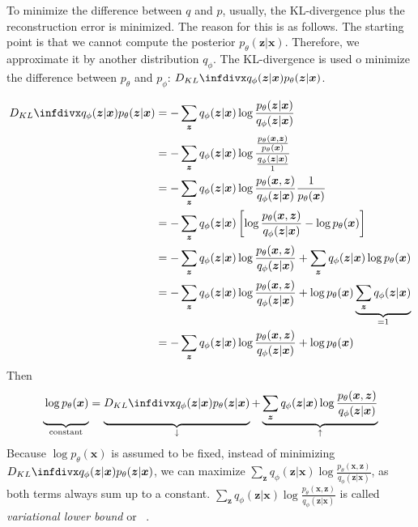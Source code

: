 To minimize the difference between $q$ and $p$, usually, the \ac{KL-divergence} plus the reconstruction error is minimized.
The reason for this is as follows.
The starting point is that we cannot compute the posterior $p_\theta(\bm{z}|\bm{x})$.
Therefore, we approximate it by another distribution $q_\phi$.
The \ac{KL-divergence} is used o minimize the difference between $p_{\theta}$ and $p_{\phi}$: $\kldiv{q_\phi(\bm{z}|\bm{x})}{p_\theta(\bm{z}|\bm{x})}$.

\begin{align}
    \kldiv{q_\phi(\bm{z}|\bm{x})}{p_\theta(\bm{z}|\bm{x})} &= -\sum_{\bm{z}} q_\phi(\bm{z}|\bm{x}) \log \frac{p_\theta(\bm{z}|\bm{x})}{q_\phi(\bm{z}|\bm{x})} \\
    &= -\sum_{\bm{z}} q_\phi(\bm{z}|\bm{x}) \log \frac{\frac{p_\theta(\bm{x},\bm{z})}{p_\theta(\bm{x})}}{\frac{q_\phi(\bm{z}|\bm{x})}{1}}\\
    &= -\sum_{\bm{z}} q_\phi(\bm{z}|\bm{x}) \log \frac{p_\theta(\bm{x},\bm{z})}{q_\phi(\bm{z}|\bm{x})}\frac{1}{p_\theta(\bm{x})}\\
    &= -\sum_{\bm{z}} q_\phi(\bm{z}|\bm{x}) \left[ \log \frac{p_\theta(\bm{x},\bm{z})}{q_\phi(\bm{z}|\bm{x})} - \log p_\theta(\bm{x}) \right]\\
    &= -\sum_{\bm{z}} q_\phi(\bm{z}|\bm{x}) \log \frac{p_\theta(\bm{x},\bm{z})}{q_\phi(\bm{z}|\bm{x})} + \sum_{\bm{z}} q_\phi(\bm{z}|\bm{x}) \log p_\theta(\bm{x}) \\
    &= -\sum_{\bm{z}} q_\phi(\bm{z}|\bm{x}) \log \frac{p_\theta(\bm{x},\bm{z})}{q_\phi(\bm{z}|\bm{x})} + \log p_\theta(\bm{x}) \underbrace{\sum_{\bm{z}} q_\phi(\bm{z}|\bm{x})}_{=1} \\
    &= -\sum_{\bm{z}} q_\phi(\bm{z}|\bm{x}) \log \frac{p_\theta(\bm{x},\bm{z})}{q_\phi(\bm{z}|\bm{x})} + \log p_\theta(\bm{x})
\end{align}
Then
\begin{align}
    \underbrace{\vphantom{\sum_{\bm{z}} x}\log p_\theta(\bm{x})}_{\text{constant}} =  \underbrace{\vphantom{\sum_{\bm{z}} x}\kldiv{q_\phi(\bm{z}|\bm{x})}{p_\theta(\bm{z}|\bm{x})}}_{\downarrow}  + \underbrace{\sum_{\bm{z}} q_\phi(\bm{z}|\bm{x}) \log \frac{p_\theta(\bm{x},\bm{z})}{q_\phi(\bm{z}|\bm{x})}}_{\uparrow}
\end{align}
Because $\log p_\theta(\bm{x})$ is assumed to be fixed, instead of minimizing $\kldiv{q_\phi(\bm{z}|\bm{x})}{p_\theta(\bm{z}|\bm{x})}$, we can maximize $\sum_{\bm{z}} q_\phi(\bm{z}|\bm{x}) \log \frac{p_\theta(\bm{x},\bm{z})}{q_\phi(\bm{z}|\bm{x})}$, as both terms always sum up to a constant.
$\sum_{\bm{z}} q_\phi(\bm{z}|\bm{x}) \log \frac{p_\theta(\bm{x},\bm{z})}{q_\phi(\bm{z}|\bm{x})}$ is called \textit{variational lower bound} or ~\citep[p. 18]{kingma2019introduction}.


